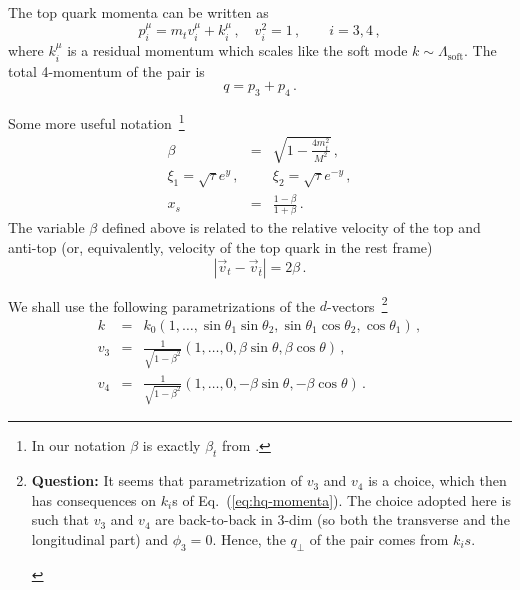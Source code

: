 \documentclass[a4paper,11pt]{report}
\numberwithin{equation}{section}
\newcommand{\question}[1]{{\bf Question:} #1}
\begin{document}
The top quark momenta can be written as
%
\begin{equation}
  p_i^\mu = m_t v_i^\mu + k_i^\mu\,,\quad v_i^2 = 1\,,\qquad i=3,4\,,
  \label{eq:hq-momenta}
\end{equation}
%
where $k_i^\mu$ is a residual momentum which scales like the soft mode $k \sim
\Lambda_\text{soft}$.
%
The total 4-momentum of the \ttbar pair is
%
\begin{equation}
  q = p_3 + p_4\,.
\end{equation}

Some more useful notation~\footnote{In our notation $\beta$ is exactly
$\beta_t$ from \cite{Li:2013mia}.}
%
\begin{eqnarray}
  \label{eq:beta-def}
  \beta & = & \sqrt{1-\frac{4 m_t^2}{M^2}}\,,\\[0.7em]
  \xi_1 = \sqrt{\tau} e^y\,, & & \xi_2 = \sqrt{\tau} e^{-y}\,,\\[0.8em]
  x_s & = &\frac{1-\beta}{1+\beta}\,.
  \label{eq:xs-def}
\end{eqnarray}
%
The variable $\beta$ defined above is related to the relative velocity of the
top and anti-top (or, equivalently, velocity of the top quark in the \ttbar rest
frame)~\cite{Ferroglia:2009ii} 
%
\begin{equation}
  |\vec v_t - \vec v_{\bar t}| = 2 \beta\,.
\end{equation}

We shall use the following parametrizations of the $d$-vectors~\footnote{ 
\question{It seems that parametrization of $v_3$ and $v_4$ is a choice, which
then has consequences on $k_i$s of Eq.~(\ref{eq:hq-momenta}). The choice adopted
here is such that $v_3$ and $v_4$ are back-to-back in 3-dim (so both the
transverse and the longitudinal part) and $\phi_3 = 0$. Hence, the $q_\perp$ of
the pair comes from $k_is$.
}
\label{fnt:param}
}
%
\begin{eqnarray}
  \label{eq:k4v-par-massless}
  k & = & k_0 (1,\ldots,\sin\theta_1\sin\theta_2,
               \sin\theta_1\cos\theta_2,\cos\theta_1)\,, \\
  v_3 & = & \frac{1}{\sqrt{1-\beta^2}}
            (1,\ldots,0,\beta\sin\theta,\beta\cos\theta)\,, \\
  v_4 & = & \frac{1}{\sqrt{1-\beta^2}}
            (1,\ldots,0,-\beta\sin\theta,-\beta\cos\theta)\,.
\end{eqnarray}
\end{document}
